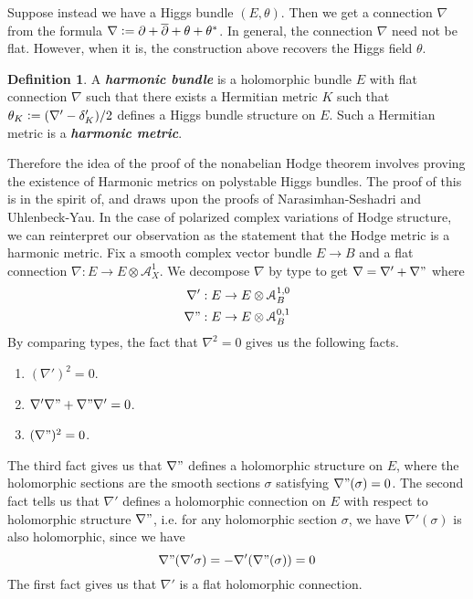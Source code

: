 \documentclass[psamsfonts, 12pt]{amsart}
\theoremstyle{definition}
\newtheorem{defn}[thm]{Definition}
\theoremstyle{remark}
\newcommand{\ib}[1]{\textbf{\textit{#1}}}
\newcommand{\dbar}{\overline{\partial}}
\newcommand{\defeq}{\vcentcolon=}
\begin{document}
Suppose instead we have a Higgs bundle $(E,\theta)$. Then we get
a connection $\nabla$ from the formula
$\nabla \defeq \partial + \dbar + \theta + \theta^*$. In general, the
connection $\nabla$ need not be flat. However, when it is, the
construction above recovers the Higgs field $\theta$.
%
\begin{defn}
A \ib{harmonic bundle} is a holomorphic bundle $E$ with flat connection
$\nabla$ such that there exists a Hermitian metric $K$ such that
$\theta_K \defeq (\nabla' - \delta'_K)/2$ defines a Higgs bundle structure on $E$.
Such a Hermitian metric is a \ib{harmonic metric}.
\end{defn}
%
Therefore the idea of the proof of the nonabelian Hodge theorem involves
proving the existence of Harmonic metrics on polystable Higgs bundles.
The proof of this is in the spirit of, and draws upon the proofs of
Narasimhan-Seshadri and Uhlenbeck-Yau.
In the case of polarized complex variations of Hodge structure, we can
reinterpret our observation as the statement that the Hodge metric is a
harmonic metric.
%
\iffalse
Fix a smooth complex vector bundle $E \to B$ and a flat connection
$\nabla : E \to E \otimes \mathcal{A}^1_X$. We decompose $\nabla$ by
type to get $\nabla = \nabla'+\nabla"$ where
\begin{align*}
\nabla' : E &\to E\otimes \mathcal{A}^{1,0}_B \\
\nabla" : E &\to E \otimes \mathcal{A}^{0,1}_B
\end{align*}
%
By comparing types, the fact that $\nabla^2 = 0$ gives us the following facts.
%
\begin{enumerate}
  \item $(\nabla')^2 = 0$.
  \item $\nabla'\nabla" + \nabla"\nabla' = 0$.
  \item $(\nabla")^2 = 0$.
\end{enumerate}
%
The third fact gives us that $\nabla"$ defines a holomorphic structure on
$E$, where the holomorphic sections are the smooth sections $\sigma$ satisfying
$\nabla"(\sigma) = 0$. The second fact tells us that $\nabla'$ defines
a holomorphic connection on $E$ with respect to holomorphic structure $\nabla"$,
i.e. for any holomorphic section $\sigma$, we have $\nabla'(\sigma)$ is also
holomorphic, since we have
\[
\nabla"(\nabla'\sigma) = -\nabla'(\nabla"(\sigma)) = 0
\]
The first fact gives us that $\nabla'$ is a flat holomorphic connection. \\
\end{document}
